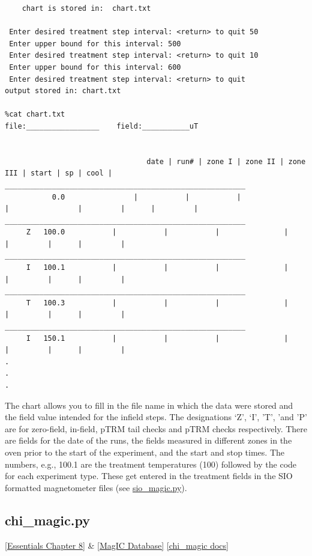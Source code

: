 \documentclass[11pt]{book}
\begin{document}
{{\begin{verbatim}
    chart is stored in:  chart.txt

 Enter desired treatment step interval: <return> to quit 50
 Enter upper bound for this interval: 500
 Enter desired treatment step interval: <return> to quit 10
 Enter upper bound for this interval: 600
 Enter desired treatment step interval: <return> to quit
output stored in: chart.txt

%cat chart.txt
file:_________________    field:___________uT


                                 date | run# | zone I | zone II | zone III | start | sp | cool |
________________________________________________________
		   0.0	              |           |           |               |                |         |      |         |
________________________________________________________
	 Z 	 100.0           |           |           |               |                |         |      |         |
________________________________________________________
	 I 	 100.1           |           |           |               |                |         |      |         |
________________________________________________________
	 T 	 100.3           |           |           |               |                |         |      |         |
________________________________________________________
	 I 	 150.1           |           |           |               |                |         |      |         |
.
.
.

\end{verbatim}

The chart allows you to fill in the file name in which the data were stored and the field value intended for the
infield steps.  The designations `Z', `I', 'T', 'and 'P'  are for zero-field, in-field, pTRM tail checks and pTRM checks respectively.  There are fields for the date of the runs, the fields measured in different zones in the oven prior to the start of the experiment, and the start and stop times.  The numbers, e.g., 100.1 are the treatment temperatures (100) followed by the code for each experiment type.  These get entered in the treatment fields in the SIO formatted magnetometer files (see \href{#SIO_magic}{sio\_magic.py}).



\subsection{chi\_magic.py}
\href{http://earthref.org/MAGIC/books/Tauxe/Essentials/WebBook3ch8.html#ch8}{[Essentials Chapter 8]} \& \href{#MagICDatabase}{[MagIC Database]}\label{ex:chi_magic}
\href{https://github.com/PmagPy/PmagPy/blob/master/programs/chi_magic.py}{[chi\_magic docs]}

}}
\end{document}
